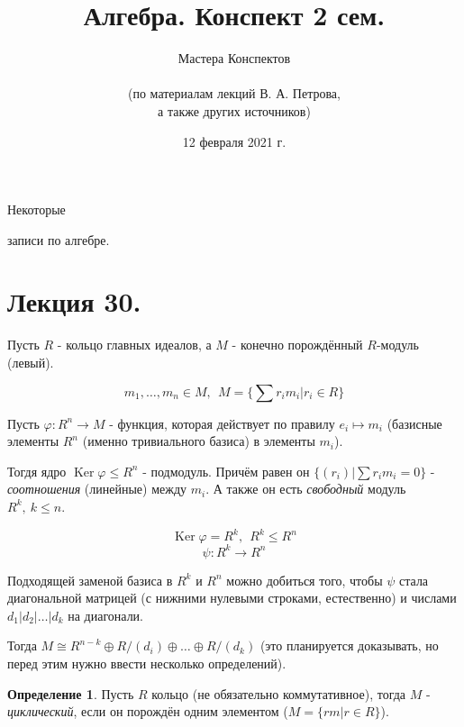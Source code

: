 \documentclass[a4paper,100pt]{article}
\title{Алгебра. Конспект 2 сем.}
\author{Мастера Конспектов\\ \\ (по материалам лекций В. А. Петрова,\\ а также других источников)}
\date{12 февраля 2021 г.}
\theoremstyle{indented}
\theoremstyle{definition}
\newtheorem{defn}{Определение}
\theoremstyle{remark}
\DeclareMathOperator{\Ker}{Ker}
\begin{document}
\newcommand{\resetexlcounters}{%
  \setcounter{exl}{0}%
} 

\newcommand{\resetremarkcounters}{%
  \setcounter{remark}{0}%
} 

\newcommand{\reseconscounters}{%
  \setcounter{cons}{0}%
} 

\newcommand{\resetall}{%
    \resetexlcounters
    \resetremarkcounters
    \reseconscounters%
}

\maketitle 

\newpage

\hypertarget{t1}{Некоторые} записи по алгебре.
\tableofcontents

\newpage


\section{Лекция 30.}

Пусть $R$ - кольцо главных идеалов, а $M$ - конечно порождённый $R$-модуль (левый). 

\[
    m_1, \ldots, m_n\in M, \:\:M=\{\sum r_im_i \vert r_i\in R\}
\]

Пусть $\varphi: R^n\rightarrow M$ - функция, которая действует по правилу $e_i\mapsto m_i$ (базисные элементы $R^n$ (именно тривиального базиса) в элементы $m_i$). \

Тогдя ядро $\Ker \varphi \leq R^n$ - подмодуль. Причём равен он $\{(r_i)\vert \sum r_im_i=0\}$ - \textit{соотношения} (линейные) между $m_i$. А также он есть \textit{свободный} модуль $R^k, \: k\leq n$. 

\[
    \Ker \varphi =R^k, \:\: R^k\leq R^n 
\]
\[
    \psi: R^k\rightarrow R^n
\]

Подходящей заменой базиса в $R^k$ и $R^n$ можно добиться того, чтобы $\psi$ стала диагональной матрицей (с нижними нулевыми строками, естественно) и числами $d_1\vert d_2\vert \ldots\vert d_k$ на диагонали.

Тогда $M\cong R^{n-k}\oplus R/(d_i)\oplus\ldots \oplus R/(d_k)$ (это планируется доказывать, но перед этим нужно ввести несколько определений).\ 

\begin{defn} 
    Пусть $R$ кольцо (не обязательно коммутативное), тогда $M$ - \textit{циклический}, если он порождён одним элементом ($M=\{rm\vert r\in R\}$).
\end{defn}
\end{document}
